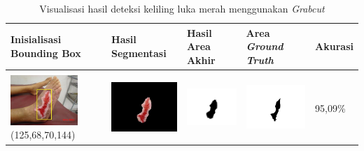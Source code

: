 \begin{table}[H]
	\centering
	\caption{Visualisasi hasil deteksi keliling luka merah menggunakan \emph{Grabcut}}
	\label{tabel_hasil_12}
	\begin{tabular}{|m{1.0in}|m{1.0in}|m{1.0in}|m{1.0in}|m{0.6in}|}
		\hline
		\textbf{Inisialisasi Bounding Box} & \textbf{Hasil Segmentasi} & \textbf{Hasil Area Akhir} & \textbf{Area \emph{Ground Truth}} & \textbf{Akurasi} \\
		\hline

		&  &  & \\
		\includegraphics[width=1.0in]{gambar/hasil_segmentasi/luka_merah/image_8_rect.jpg} {\centering\fontsize{10}{10}\selectfont(125,68,70,144)}&
		\includegraphics[width=1.0in]{gambar/hasil_segmentasi/luka_merah/result_8.jpg}&
		\includegraphics[width=1.0in]{gambar/hasil_segmentasi/luka_merah/mask_r_8.jpg}&
		\includegraphics[width=1.0in]{gambar/hasil_segmentasi/luka_merah/8_r.jpg}&
		95,09\% \\
		\hline


\end{tabular}
\end{table}
